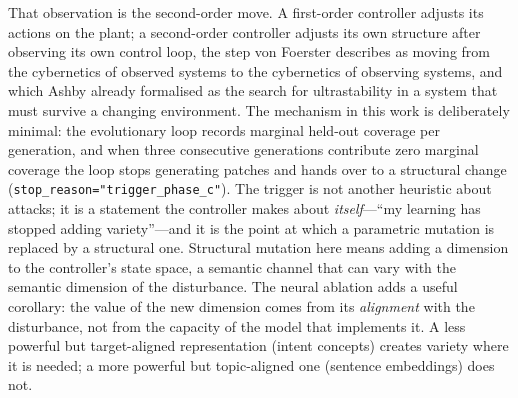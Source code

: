 That observation is the second-order move. A first-order controller adjusts its
actions on the plant; a second-order controller adjusts its own structure after
observing its own control loop, the step von Foerster describes as moving from
the cybernetics of observed systems to the cybernetics of observing systems, and
which Ashby already formalised as the search for ultrastability in a system
that must survive a changing environment. The mechanism in this work is
deliberately minimal: the evolutionary loop records marginal held-out coverage
per generation, and when three consecutive generations contribute zero marginal
coverage the loop stops generating patches and hands over to a structural change
(\texttt{stop\_reason="trigger\_phase\_c"}). The trigger is not another
heuristic about attacks; it is a statement the controller makes about
\emph{itself}---``my learning has stopped adding variety''---and it is the point
at which a parametric mutation is replaced by a structural one. Structural
mutation here means adding a dimension to the controller's state space, a
semantic channel that can vary with the semantic dimension of the disturbance.
The neural ablation adds a useful corollary: the value of the new dimension
comes from its \emph{alignment} with the disturbance, not from the capacity of
the model that implements it. A less powerful but target-aligned representation
(intent concepts) creates variety where it is needed; a more powerful but
topic-aligned one (sentence embeddings) does not.

